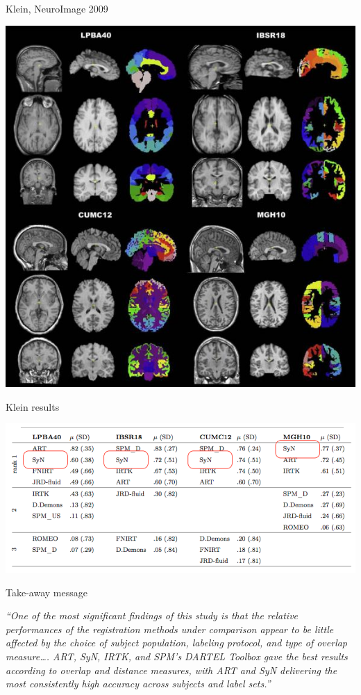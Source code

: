 \documentclass[ignorenonframetext,]{beamer}
\begin{document}
\begin{frame}{Klein, NeuroImage 2009}

\includegraphics{./competitions/figures/nihms-130679-f0001.jpg}

\end{frame}

\begin{frame}{Klein results}

\includegraphics{./competitions/figures/KleinResults2009.png}

\end{frame}

\begin{frame}{Take-away message}

\emph{``One of the most significant findings of this study is that the
relative performances of the registration methods under comparison
appear to be little affected by the choice of subject population,
labeling protocol, and type of overlap measure\ldots{}. ART, SyN, IRTK,
and SPM's DARTEL Toolbox gave the best results according to overlap and
distance measures, with ART and SyN delivering the most consistently
high accuracy across subjects and label sets.''}

\end{frame}
\end{document}
